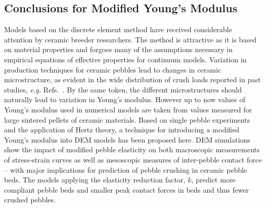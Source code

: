\subsection{Conclusions for Modified Young's Modulus}
Models based on the discrete element method have received considerable attention by ceramic breeder researchers. The method is attractive as it is based on material properties and forgoes many of the assumptions necessary in empirical equations of effective properties for continuum models. Variation in production techniques for ceramic pebbles lead to changes in ceramic microstructure, as evident in the wide distribution of crush loads reported in past studies, \textit{e.g.} Refs.~\cite{Zhao2012,Mandal2012a}. By the same token, the different microstructures should naturally lead to variation in Young’s modulus. However up to now values of Young’s modulus used in numerical models are taken from values measured for large sintered pellets of ceramic materials. Based on single pebble experiments and the application of Hertz theory, a technique for introducing a modified Young’s modulus into DEM models has been proposed here. DEM simulations show the impact of modified pebble elasticity on both macroscopic measurements of stress-strain curves as well as mesoscopic measures of inter-pebble contact force – with major implications for prediction of pebble crushing in ceramic pebble beds. The models applying the elasticity reduction factor, $k$, predict more compliant pebble beds and smaller peak contact forces in beds and thus fewer crushed pebbles.